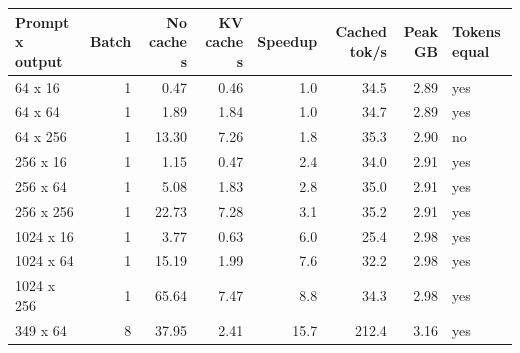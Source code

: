 \begin{tabular}{lrrrrrrl}
\toprule
Prompt x output & Batch & No cache s & KV cache s & Speedup & Cached tok/s & Peak GB & Tokens equal \\
\midrule
64 x 16 & 1 & 0.47 & 0.46 & 1.0 & 34.5 & 2.89 & yes \\
64 x 64 & 1 & 1.89 & 1.84 & 1.0 & 34.7 & 2.89 & yes \\
64 x 256 & 1 & 13.30 & 7.26 & 1.8 & 35.3 & 2.90 & no \\
256 x 16 & 1 & 1.15 & 0.47 & 2.4 & 34.0 & 2.91 & yes \\
256 x 64 & 1 & 5.08 & 1.83 & 2.8 & 35.0 & 2.91 & yes \\
256 x 256 & 1 & 22.73 & 7.28 & 3.1 & 35.2 & 2.91 & yes \\
1024 x 16 & 1 & 3.77 & 0.63 & 6.0 & 25.4 & 2.98 & yes \\
1024 x 64 & 1 & 15.19 & 1.99 & 7.6 & 32.2 & 2.98 & yes \\
1024 x 256 & 1 & 65.64 & 7.47 & 8.8 & 34.3 & 2.98 & yes \\
349 x 64 & 8 & 37.95 & 2.41 & 15.7 & 212.4 & 3.16 & yes \\
\bottomrule
\end{tabular}
